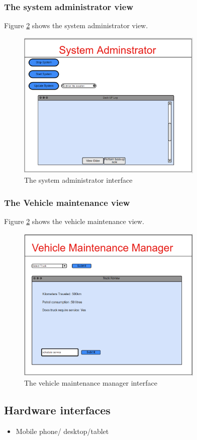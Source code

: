 \documentclass[paper=a4, fontsize=11pt]{scrartcl} %
\numberwithin{equation}{section} %
\numberwithin{figure}{section} %
\numberwithin{table}{section} %
\begin{document}
\subsubsection{The system administrator view}
Figure \ref{Sender} shows the system administrator view.
\begin{figure}[h!]
\centering
\includegraphics[width=3.5in]{pictures/admin.png}
\caption{The system administrator interface}
\label{Sender}
\end{figure}

\subsubsection{The Vehicle maintenance view}
Figure \ref{Sender} shows the vehicle maintenance view.
\begin{figure}[h!]
\centering
\includegraphics[width=3.5in]{pictures/vehicle.png}
\caption{The vehicle maintenance manager interface}
\label{Sender}
\end{figure}

\subsection{Hardware interfaces}
\begin{itemize}
			\item Mobile phone/ desktop/tablet
\end{itemize}
\end{document}
